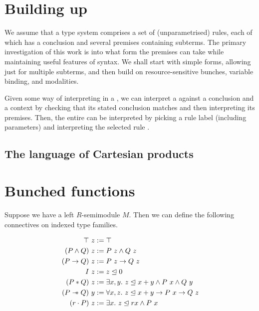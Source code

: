 \documentclass[a4paper]{article}
\begin{document}
\section{Building up}

We assume that a type system comprises a set of (unparametrised) rules, each
of which has a conclusion and several premises containing subterms.
The primary investigation of this work is into what form the premises can take
while maintaining useful features of syntax.
We shall start with simple forms, allowing just for multiple subterms, and
then build on resource-sensitive bunches, variable binding, and modalities.

\System{}
\Rule{}

Given some way  of interpreting
 in a , we can interpret a
 against a conclusion and a context by checking that its
stated conclusion matches and then interpreting its premises.
Then, the entire  can be interpreted by picking a rule
label (including parameters)  and interpreting the selected rule
\AgdaSpace{}.

\semr{}
\sems{}

\subsection{The language of Cartesian products}

\SimplePremises

\section{Bunched functions}

Suppose we have a left $R$-semimodule $M$.
Then we can define the following connectives on indexed type families.

\begin{align*}
  \top~z &:= \top \\
  (P \wedge Q)~z &:= P~z \wedge Q~z \\
  (P \to Q)~z &:= P~z \to Q~z \\
  I~z &:= z \trianglelefteq 0 \\
  (P * Q)~z &:= \exists x,y.~z \trianglelefteq x+y \wedge P~x \wedge Q~y \\
  (P \mathrel{\mathord{-}\hspace{-0.75ex}*} Q)~y &:= \forall x,z.~z \trianglelefteq x+y \to P~x \to Q~z \\
  (r \cdot P)~z &:= \exists x.~z \trianglelefteq rx \wedge P~x
\end{align*}
\end{document}
